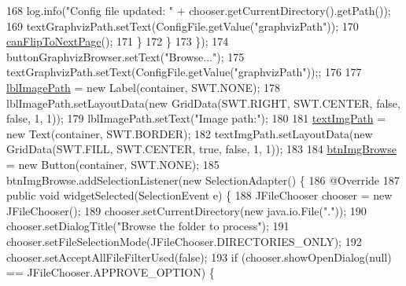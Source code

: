 \begin{DoxyCode}
168                     log.info(\textcolor{stringliteral}{"Config file updated: "} + chooser.getCurrentDirectory().getPath());
169                     textGraphvizPath.setText(ConfigFile.getValue(\textcolor{stringliteral}{"graphvizPath"}));
170                     \hyperlink{classit_1_1isislab_1_1masonhelperdocumentation_1_1mason_1_1wizards_1_1_b___project_information_page_af534554cbdceb3c61b1f48b5df4e290c}{canFlipToNextPage}();
171                 \}
172             \}
173         \});
174         buttonGraphvizBrowser.setText(\textcolor{stringliteral}{"Browse..."});
175         textGraphvizPath.setText(ConfigFile.getValue(\textcolor{stringliteral}{"graphvizPath"}));;
176         
177         \hyperlink{classit_1_1isislab_1_1masonhelperdocumentation_1_1mason_1_1wizards_1_1_b___project_information_page_a36bd57a557296f92577dfd09d585cc52}{lblImagePath} = \textcolor{keyword}{new} Label(container, SWT.NONE);
178         lblImagePath.setLayoutData(\textcolor{keyword}{new} GridData(SWT.RIGHT, SWT.CENTER, \textcolor{keyword}{false}, \textcolor{keyword}{false}, 1, 1));
179         lblImagePath.setText(\textcolor{stringliteral}{"Image path:"});
180         
181         \hyperlink{classit_1_1isislab_1_1masonhelperdocumentation_1_1mason_1_1wizards_1_1_b___project_information_page_a2d8d332de830585ce52efe2c43ff9e2b}{textImgPath} = \textcolor{keyword}{new} Text(container, SWT.BORDER);
182         textImgPath.setLayoutData(\textcolor{keyword}{new} GridData(SWT.FILL, SWT.CENTER, \textcolor{keyword}{true}, \textcolor{keyword}{false}, 1, 1));
183         
184         \hyperlink{classit_1_1isislab_1_1masonhelperdocumentation_1_1mason_1_1wizards_1_1_b___project_information_page_a0c6e3746265bd68e2ef73050896e03af}{btnImgBrowse} = \textcolor{keyword}{new} Button(container, SWT.NONE);
185         btnImgBrowse.addSelectionListener(\textcolor{keyword}{new} SelectionAdapter() \{
186             @Override
187             \textcolor{keyword}{public} \textcolor{keywordtype}{void} widgetSelected(SelectionEvent e) \{
188                 JFileChooser chooser = \textcolor{keyword}{new} JFileChooser();
189                 chooser.setCurrentDirectory(\textcolor{keyword}{new} java.io.File(\textcolor{stringliteral}{"."}));
190                 chooser.setDialogTitle(\textcolor{stringliteral}{"Browse the folder to process"});
191                 chooser.setFileSelectionMode(JFileChooser.DIRECTORIES\_ONLY);
192                 chooser.setAcceptAllFileFilterUsed(\textcolor{keyword}{false});
193                 \textcolor{keywordflow}{if} (chooser.showOpenDialog(null) == JFileChooser.APPROVE\_OPTION) \{                  

\end{DoxyCode}
